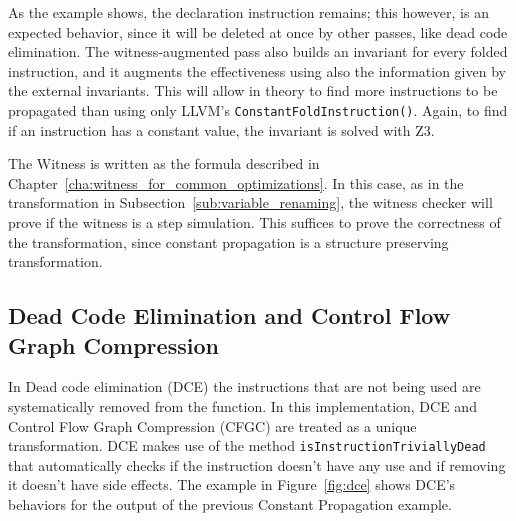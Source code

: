 As the example shows, the declaration instruction remains; this however, is an expected behavior, since it will be deleted at once by other passes, like dead code elimination. The witness-augmented pass also builds an invariant for every folded instruction, and it augments the effectiveness using also the information given by the external invariants. This will allow in theory to find more instructions to be propagated than using only LLVM's \texttt{ConstantFoldInstruction()}. Again, to find if an instruction has a constant value, the invariant is solved with Z3.

The Witness is written as the formula described in Chapter~\ref{cha:witness_for_common_optimizations}. In this case, as in the transformation in Subsection~\ref{sub:variable_renaming}, the witness checker will prove if the witness is a step simulation. This suffices to prove the correctness of the transformation, since constant propagation is a structure preserving transformation.

\subsection{Dead Code Elimination and Control Flow Graph Compression}
\label{sub:dce_and_cfgc}

In Dead code elimination (DCE) the instructions that are not being used are systematically removed from the function. In this implementation, DCE and Control Flow Graph Compression  (CFGC) are treated as a unique transformation. DCE makes use of the method \texttt{isInstructionTriviallyDead} that automatically checks if the instruction doesn't have any use and if removing it doesn't have side effects. The example in Figure~\ref{fig:dce} shows DCE's behaviors for the output of the previous Constant Propagation example.

